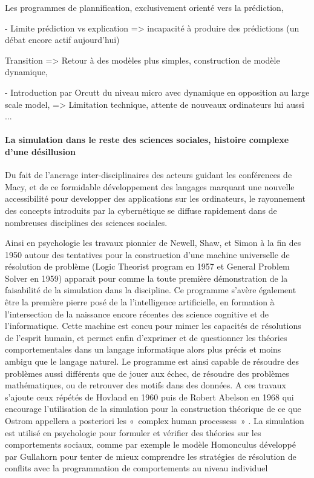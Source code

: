 {Les programmes de plannification, exclusivement orienté vers la prédiction, 

- Limite prédiction vs explication => incapacité à produire des prédictions (un débat encore actif aujourd'hui)

Transition => Retour à des modèles plus simples, construction de modèle dynamique, 

- Introduction par Orcutt du niveau micro avec dynamique en opposition au large scale model, 
	=> Limitation technique, attente de nouveaux ordinateurs lui aussi ...

\paragraph{La simulation dans le reste des sciences sociales, histoire complexe d'une désillusion}

Du fait de l'ancrage inter-disciplinaires des acteurs guidant les conférences de Macy, et de ce formidable développement des langages marquant une nouvelle accessibilité pour developper des applications sur les ordinateurs, le rayonnement des concepts introduits par la cybernétique se diffuse rapidement dans de nombreuses disciplines des sciences sociales. 

Ainsi en psychologie les travaux pionnier de Newell, Shaw, et Simon à la fin des 1950 autour des tentatives pour la construction d'une machine universelle de résolution de problème (Logic Theorist program en 1957 et General Problem Solver en 1959) apparait pour \autocite{Gullahorn1965}  comme la toute première démonstration de la faisabilité de la simulation dans la discipline. Ce programme s'avère également être la première pierre posé de la l'intelligence artificielle, en formation à l'intersection de la naissance encore récentes des science cognitive et de l'informatique. Cette machine est concu pour mimer les capacités de résolutions de l'esprit humain, et permet enfin d'exprimer et de questionner les théories comportementales dans un langage informatique alors plus précis et moins ambigu que le langage naturel. Le programme est ainsi capable de résoudre des problèmes aussi différents que de jouer aux échec, de résoudre des problèmes mathématiques,  ou de retrouver des motifs dans des données. A ces travaux s'ajoute ceux répétés de Hovland en 1960 puis de Robert Abelson en 1968  qui encourage l'utilisation de la simulation pour la construction théorique de ce que Ostrom appellera a posteriori les « complex human processess » \autocite{Ostrom1988}. La simulation est utilisé en psychologie pour formuler et vérifier des théories sur les comportements sociaux\autocite{Gullahorn1965a}, comme par exemple le modèle Homonculus développé par Gullahorn pour tenter de mieux comprendre les stratégies de résolution de conflits avec la programmation de comportements au niveau individuel \autocite{Gullahorn1965} 

}
